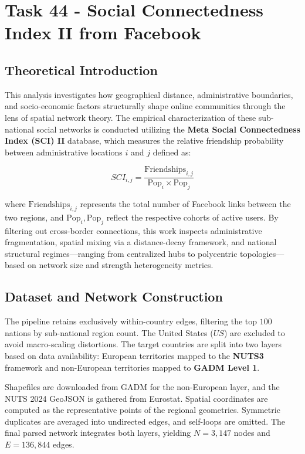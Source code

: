 \chapter{Task 44 - Social Connectedness Index II from Facebook}
\label{ch:task44}

\section{Theoretical Introduction}

This analysis investigates how geographical distance, administrative boundaries, and socio-economic factors structurally shape online communities through the lens of spatial network theory. The empirical characterization of these sub-national social networks is conducted utilizing the \textbf{Meta Social Connectedness Index (SCI) II} database, which measures the relative friendship probability between administrative locations $i$ and $j$ defined as:\cite{bailey2018social}

\begin{equation}\label{eq:sci_definition}
    SCI_{i,j}=\frac{\text{Friendships}_{i,j}}{\text{Pop}_i \times \text{Pop}_j}
\end{equation}

where $\text{Friendships}_{i,j}$ represents the total number of Facebook links between the two regions, and $\text{Pop}_i, \text{Pop}_j$ reflect the respective cohorts of active users.\cite{bailey2018social} By filtering out cross-border connections, this work inspects administrative fragmentation, spatial mixing via a distance-decay framework, and national structural regimes—ranging from centralized hubs to polycentric topologies—based on network size and strength heterogeneity metrics.

\section{Dataset and Network Construction}
The pipeline retains exclusively within-country edges, filtering the top $100$ nations by sub-national region count.\cite{hdx2026facebook} The United States ($US$) are excluded to avoid macro-scaling distortions. The target countries are split into two layers based on data availability: European territories mapped to the \textbf{NUTS3} framework and non-European territories mapped to \textbf{GADM Level 1}.

Shapefiles are downloaded from GADM for the non-European layer,\cite{gadm2025database} and the NUTS 2024 GeoJSON is gathered from Eurostat.\cite{eurostat2024nuts} Spatial coordinates are computed as the representative points of the regional geometries. Symmetric duplicates are averaged into undirected edges, and self-loops are omitted. The final parsed network integrates both layers, yielding $N = 3,147$ nodes and $E = 136,844$ edges.


